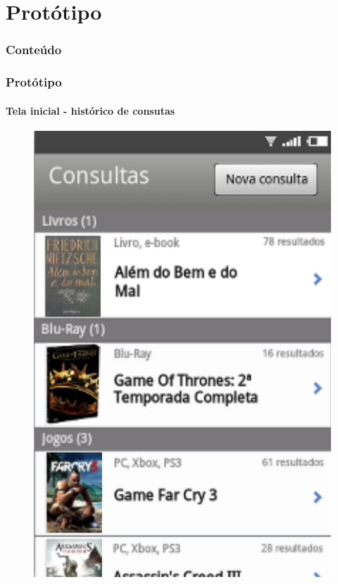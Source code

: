 \documentclass[14pt,beamer]{beamer}
\begin{document}
\section{Protótipo}

\begin{frame}
	\frametitle{Conteúdo}
    \begin{multicols}{2}
        \small
    \end{multicols}
\end{frame}

\begin{frame}
	\frametitle{Protótipo}
	\framesubtitle{Tela inicial - histórico de consutas}

    \begin{figure}
        \centering
        \includegraphics[scale=.71]{tela/TelaHistorico}
    \end{figure}
\end{frame}
\end{document}
